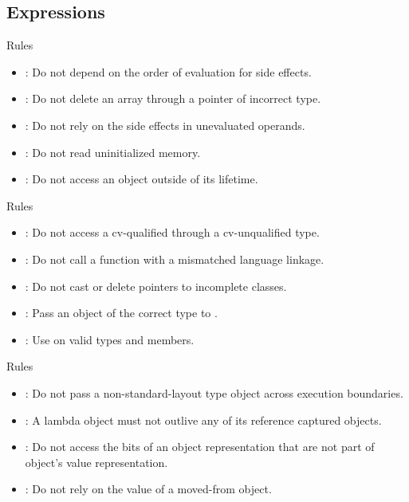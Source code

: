 \subsection{Expressions}

\begin{frame}[t]{Rules}
\begin{itemize}
  \item {}: 
        Do not depend on the order of evaluation for side effects.
  \vfill
  \item {}: 
        Do not delete an array through a pointer of incorrect type.
  \vfill
  \item {}: 
        Do not rely on the side effects in unevaluated operands.
  \vfill
  \item {}:
        Do not read uninitialized memory.
  \vfill
  \item {}:
        Do not access an object outside of its lifetime. 
\end{itemize}
\end{frame}

\begin{frame}[t]{Rules}
\begin{itemize}
  \item {}:
        Do not access a cv-qualified through a cv-unqualified type. 
  \vfill
  \item {}:
        Do not call a function with a mismatched language linkage. 
  \vfill
  \item {}: 
        Do not cast or delete pointers to incomplete classes.
  \vfill
  \item {}:
        Pass an object of the correct type to . 
  \vfill
  \item {}: 
        Use  on valid types and members.
\end{itemize}
\end{frame}

\begin{frame}[t]{Rules}
\begin{itemize}
  \item {}: 
        Do not pass a non-standard-layout type object across execution boundaries. 
  \vfill
  \item {}:
        A lambda object must not outlive any of its reference captured objects. 
  \vfill
  \item {}:
        Do not access the bits of an object representation that are not part
        of object's value representation. 
  \vfill
  \item {}: 
        Do not rely on the value of a moved-from object.
\end{itemize}
\end{frame}
